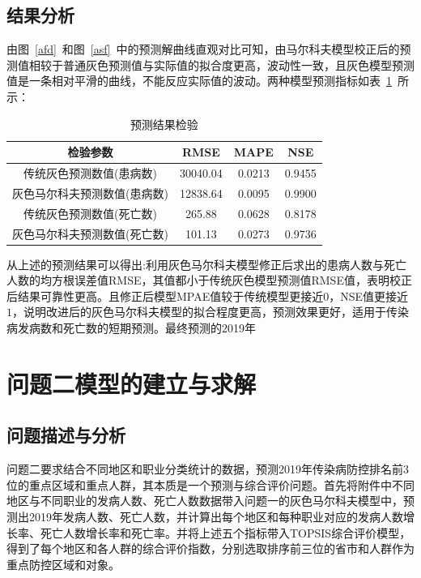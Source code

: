 \documentclass{whutmod}
\begin{document}
   \subsection{结果分析}
	
	由图~\ref{afd}~和图~\ref{asf}~中的预测解曲线直观对比可知，由马尔科夫模型校正后的预测值相较于普通灰色预测值与实际值的拟合度更高，波动性一致，且灰色模型预测值是一条相对平滑的曲线，不能反应实际值的波动。两种模型预测指标如表~\ref{jjj}~所示：
 \begin{table}[H]
	\centering\caption{预测结果检验}\label{jjj}
	\begin{tabular}{cccc}
		\toprule[1.5pt]
		\multicolumn{1}{m{6cm}}{\centering 检验参数}
		& \multicolumn{1}{m{2cm}}{\centering RMSE}
		& \multicolumn{1}{m{2cm}}{\centering MAPE}
		& \multicolumn{1}{m{2cm}}{\centering NSE}
		\\
			\midrule[0.5pt]	
	    传统灰色预测数值(患病数) &   30040.04 &  0.0213 & 0.9455\\ 
		灰色马尔科夫预测数值(患病数)&  12838.64  &  0.0095  &  0.9900 \\ 
		传统灰色预测数值(死亡数) &  265.88   & 0.0628   &0.8178  \\
		灰色马尔科夫预测数值(死亡数) &   101.13 &   0.0273 & 0.9736  \\   
		\bottomrule[1.5pt]	
	\end{tabular}
\end{table} 

    从上述的预测结果可以得出:利用灰色马尔科夫模型修正后求出的患病人数与死亡人数的均方根误差值RMSE，其值都小于传统灰色模型预测值RMSE值，表明校正后结果可靠性更高。且修正后模型MPAE值较于传统模型更接近$0$，NSE值更接近 $1$，说明改进后的灰色马尔科夫模型的拟合程度更高，预测效果更好，适用于传染病发病数和死亡数的短期预测。最终预测的2019年



	  
	  \section{问题二模型的建立与求解}
	  \subsection{问题描述与分析}
	
	问题二要求结合不同地区和职业分类统计的数据，预测2019年传染病防控排名前3位的重点区域和重点人群，其本质是一个预测与综合评价问题。首先将附件中不同地区与不同职业的发病人数、死亡人数数据带入问题一的灰色马尔科夫模型中，预测出2019年发病人数、死亡人数，并计算出每个地区和每种职业对应的发病人数增长率、死亡人数增长率和死亡率。并将上述五个指标带入TOPSIS综合评价模型，得到了每个地区和各人群的综合评价指数，分别选取排序前三位的省市和人群作为重点防控区域和对象。
\end{document}
